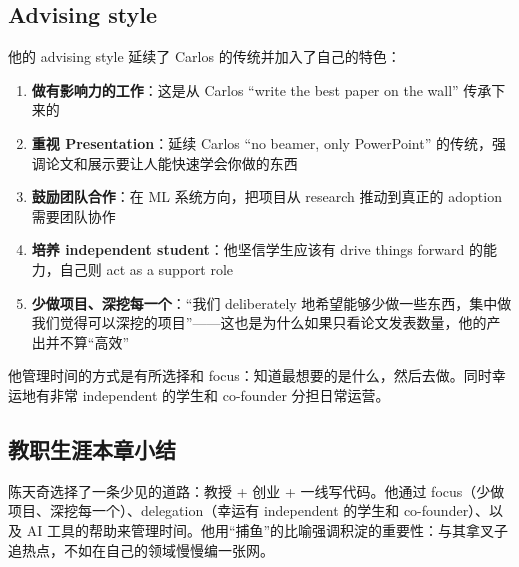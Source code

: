 \subsection{Advising style}

他的 advising style 延续了 Carlos 的传统并加入了自己的特色：

\begin{enumerate}
    \item \textbf{做有影响力的工作}：这是从 Carlos ``write the best paper on the wall'' 传承下来的
    \item \textbf{重视 Presentation}：延续 Carlos ``no beamer, only PowerPoint'' 的传统，强调论文和展示要让人能快速学会你做的东西
    \item \textbf{鼓励团队合作}：在 ML 系统方向，把项目从 research 推动到真正的 adoption 需要团队协作
    \item \textbf{培养 independent student}：他坚信学生应该有 drive things forward 的能力，自己则 act as a support role
    \item \textbf{少做项目、深挖每一个}：``我们 deliberately 地希望能够少做一些东西，集中做我们觉得可以深挖的项目''------这也是为什么如果只看论文发表数量，他的产出并不算``高效''
\end{enumerate}

他管理时间的方式是有所选择和 focus：知道最想要的是什么，然后去做。同时幸运地有非常 independent 的学生和 co-founder 分担日常运营。

\subsection{教职生涯本章小结}

陈天奇选择了一条少见的道路：教授 + 创业 + 一线写代码。他通过 focus（少做项目、深挖每一个）、delegation（幸运有 independent 的学生和 co-founder）、以及 AI 工具的帮助来管理时间。他用``捕鱼''的比喻强调积淀的重要性：与其拿叉子追热点，不如在自己的领域慢慢编一张网。

